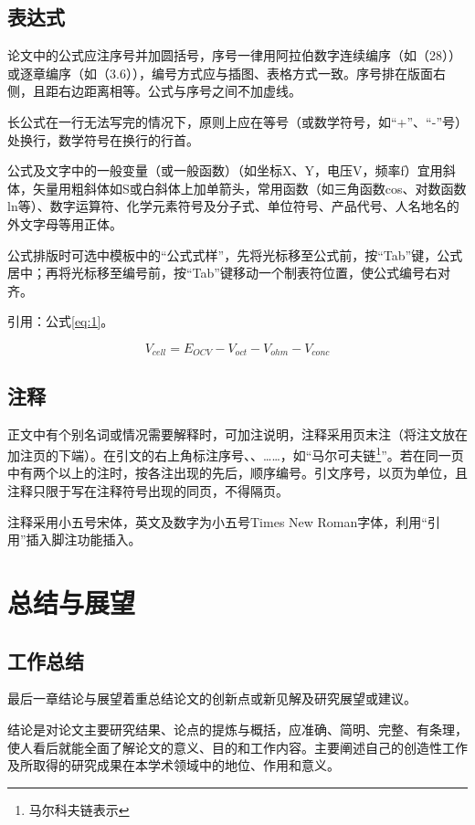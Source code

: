 \documentclass{seuthesis-2019}
\begin{document}
\section{表达式}
论文中的公式应注序号并加圆括号，序号一律用阿拉伯数字连续编序（如（28））或逐章编序（如（3.6）），编号方式应与插图、表格方式一致。序号排在版面右侧，且距右边距离相等。公式与序号之间不加虚线。

长公式在一行无法写完的情况下，原则上应在等号（或数学符号，如“+”、“-”号）处换行，数学符号在换行的行首。

公式及文字中的一般变量（或一般函数）（如坐标X、Y，电压V，频率f）宜用斜体，矢量用粗斜体如S或白斜体上加单箭头，常用函数（如三角函数cos、对数函数ln等）、数字运算符、化学元素符号及分子式、单位符号、产品代号、人名地名的外文字母等用正体。

公式排版时可选中模板中的“公式式样”，先将光标移至公式前，按“Tab”键，公式居中；再将光标移至编号前，按“Tab”键移动一个制表符位置，使公式编号右对齐。

引用：公式\eqref{eq:1}。

\begin{equation}\label{eq:1}
V_{cell}=E_{OCV}-V_{oct}-V_{ohm}-V_{conc}
\end{equation}
  
\section{注释}
正文中有个别名词或情况需要解释时，可加注说明，注释采用页末注（将注文放在加注页的下端）。在引文的右上角标注序号、、……，如“马尔可夫链\footnote{马尔科夫链表示}”。若在同一页中有两个以上的注时，按各注出现的先后，顺序编号。引文序号，以页为单位，且注释只限于写在注释符号出现的同页，不得隔页。

注释采用小五号宋体，英文及数字为小五号Times New Roman字体，利用“引用”插入脚注功能插入。

\chapter{总结与展望}
\section{工作总结}
最后一章结论与展望着重总结论文的创新点或新见解及研究展望或建议。

结论是对论文主要研究结果、论点的提炼与概括，应准确、简明、完整、有条理，使人看后就能全面了解论文的意义、目的和工作内容。主要阐述自己的创造性工作及所取得的研究成果在本学术领域中的地位、作用和意义。
\end{document}
